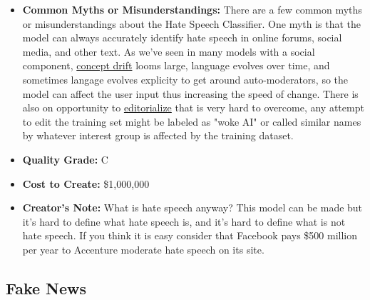 \begin{itemize}
\begin{itemize}
    \item \textbf{Common Myths or Misunderstandings:} There are a few common myths or misunderstandings about the Hate Speech Classifier. One myth is that the model can always accurately identify hate speech in online forums, social media, and other text. As we've seen in many models with a social component, \hyperref[sec:drift]{concept drift} looms large, language evolves over time, and sometimes langage evolves explicity to get around auto-moderators, so the model can affect the user input thus increasing the speed of change. There is also on opportunity to \hyperref[sec:janitor]{editorialize} that is very hard to overcome, any attempt to edit the training set might be labeled as "woke AI" or called similar names by whatever interest group is affected by the training dataset.  
    \item \textbf{Quality Grade:} C
    \item \textbf{Cost to Create:} \$1,000,000
    \item \textbf{Creator's Note:} What is hate speech anyway? This model can be made but it's hard to define what hate speech is, and it's hard to define what is not hate speech. If you think it is easy consider that Facebook pays \$500 million per year to Accenture moderate hate speech on its site.
\end{itemize}

\subsection{Fake News}


\end{itemize}
